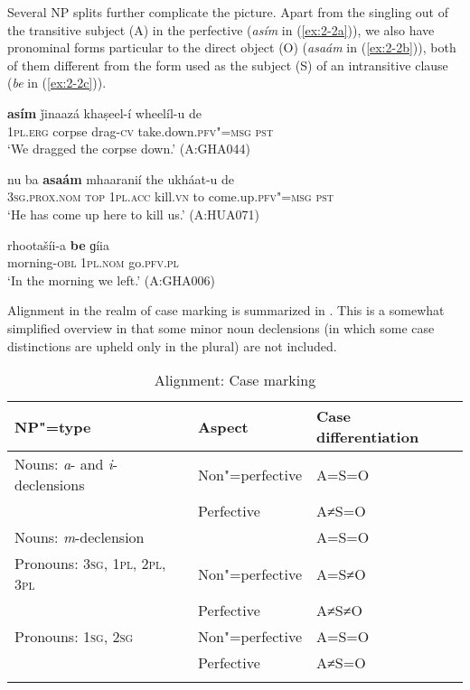 Several NP splits further complicate the picture. Apart from the singling out of the transitive subject (A) in the perfective (\textit{asím} in (\ref{ex:2-2a})), we also have pronominal forms particular to the direct object (O) (\textit{asaám} in (\ref{ex:2-2b})), both of them different from the form used as the subject (S) of an intransitive clause (\textit{be} in (\ref{ex:2-2c})).

\begin{exe}
\ex
\label{ex:2-2a}
\gll \textbf{asím} ǰinaazá khaṣeel-í wheelíl-u de \\
\textsc{1pl.erg} corpse drag-\textsc{cv} take.down.\textsc{pfv"=msg} \textsc{pst}  \\
\glt `We dragged the corpse down.' (A:GHA044)

\ex
\label{ex:2-2b}
\gll nu ba \textbf{asaám} mhaaranií the ukháat-u de \\
\textsc{3sg.prox.nom} \textsc{top} \textsc{1pl.acc} kill.\textsc{vn} to come.up.\textsc{pfv"=msg} \textsc{pst}  \\
\glt `He has come up here to kill us.' (A:HUA071)

\ex
\label{ex:2-2c}
\gll rhootašíi-a \textbf{be} ɡíia  \\
morning-\textsc{obl} \textsc{1pl.nom} go.\textsc{pfv.pl}  \\
\glt `In the morning we left.' (A:GHA006)
\end{exe}


Alignment in the realm of case marking is summarized in . This is a somewhat simplified overview in that some minor noun declensions (in which some case distinctions are upheld only in the plural) are not included.


\begin{table}[ht]
\caption{Alignment: Case marking}
\begin{tabularx}{\textwidth}{ l l Q }
\lsptoprule
NP"=type &
Aspect &
Case differentiation\\\hline
Nouns: \textit{a}- and \textit{i}-declensions &
Non"=perfective &
A=S=O \\
&
Perfective &
A≠S=O \\
Nouns: \textit{m}-declension &
&
A=S=O \\
Pronouns: \textsc{3sg, 1pl, 2pl, 3pl} &
Non"=perfective &
A=S≠O \\
&
Perfective &
A≠S≠O \\  
Pronouns: \textsc{1sg, 2sg} &
Non"=perfective &
A=S=O \\
&
Perfective &
A≠S=O
\\\lspbottomrule
\end{tabularx}
\label{tab:2-casealign}
\end{table}


